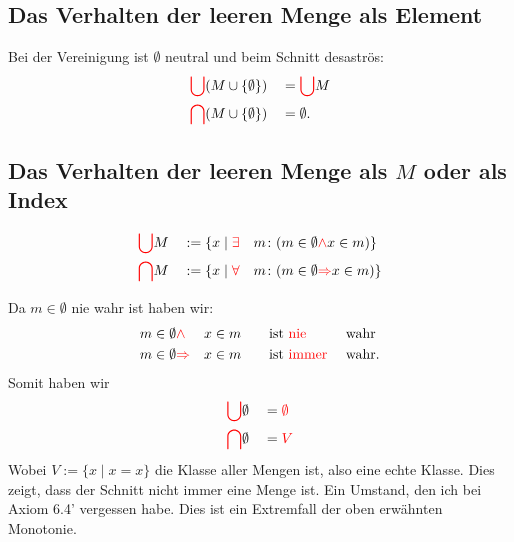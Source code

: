 \documentclass[a4paper]{amsart}
\theoremstyle{definition}
\begin{document}
\subsection{Das Verhalten der leeren Menge als Element}
Bei der Vereinigung ist $\emptyset$ neutral und beim Schnitt desaströs:
\begin{alignat}{4}\label{leere}
   &{\color{red} \bigcup} (M \cup \{\emptyset\}) &&={\color{red} \bigcup} M\\
   &{\color{red} \bigcap} (M \cup \{\emptyset\}) &&=\emptyset.
\end{alignat}

\subsection{Das Verhalten der leeren Menge als $M$ oder als Index}
\begin{alignat}{4}\label{DefinitionMitLeererMenge}
   &{\color{red} \bigcup} M &&:= \{ x \mid {\color{red}\exists} &&m \colon (m \in \emptyset {\color{red}\land} x \in m) \}\\
   &{\color{red} \bigcap} M &&:= \{ x \mid {\color{red}\forall} &&m \colon (m \in \emptyset {\color{red}\Rightarrow} x \in m) \}
\end{alignat}

Da $m \in \emptyset$ nie wahr ist haben wir:
\begin{alignat}{4}\label{NieUndImmerWahr}
   &m \in \emptyset {\color{red}\land}       &&x \in m \quad &&\text{ist {\color{red}nie }}   &&\text{wahr}\\
   &m \in \emptyset {\color{red}\Rightarrow} &&x \in m \quad &&\text{ist {\color{red}immer }} &&\text{wahr}.
\end{alignat}
Somit haben wir
\begin{alignat}{4}\label{LeererMenge}
   &{\color{red} \bigcup} \emptyset &&= {\color{red} \emptyset}\\
   &{\color{red} \bigcap} \emptyset &&= {\color{red} V}
\end{alignat}
Wobei $V := \{x \mid x = x\}$ die Klasse aller Mengen ist, also eine echte Klasse. Dies zeigt, dass der Schnitt nicht immer eine Menge ist. Ein Umstand, den ich bei Axiom 6.4' vergessen habe. Dies ist ein Extremfall der oben erwähnten Monotonie.
\end{document}
